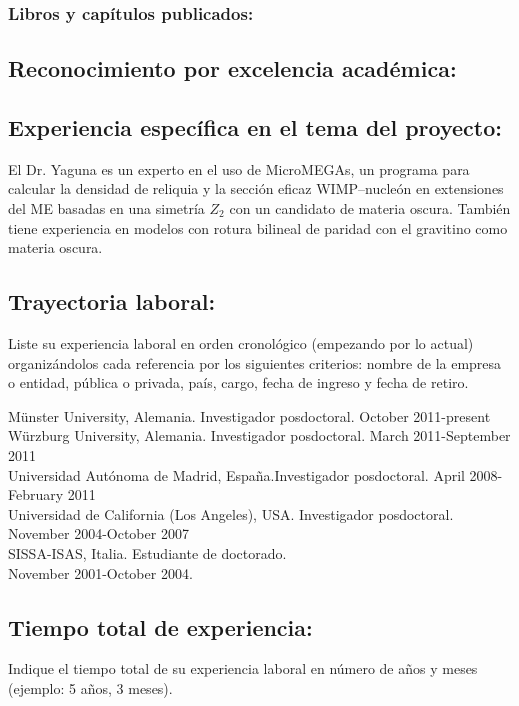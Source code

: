 \subsubsection{Libros y capítulos publicados:}
\subsection{Reconocimiento por excelencia académica:}
\subsection{Experiencia específica en el tema del proyecto:}
El Dr. Yaguna es un experto en el uso de MicroMEGAs, un programa para
calcular la densidad de reliquia y la sección eficaz WIMP--nucleón en
extensiones del ME basadas en una simetría $Z_2$ con un candidato de
materia oscura. También tiene experiencia en modelos con rotura
bilineal de paridad con el gravitino como materia oscura.
\subsection{Trayectoria laboral:}
\begin{instrucciones}
  Liste su experiencia laboral en orden cronológico (empezando por lo
  actual) organizándolos cada referencia por los siguientes criterios:
  nombre de la empresa o entidad, pública o privada, país, cargo,
  fecha de ingreso y fecha de retiro.
\end{instrucciones}
M\"unster University, Alemania. Investigador posdoctoral. October 2011-present\\
W\"urzburg University, Alemania. Investigador posdoctoral. March 2011-September 2011\\
Universidad Autónoma de Madrid, España.Investigador posdoctoral. April 2008-February 2011\\
Universidad de California (Los Angeles), USA. Investigador posdoctoral. November 2004-October 2007\\
SISSA-ISAS, Italia. Estudiante de doctorado.\\ November 2001-October 2004.\\
\subsection{Tiempo total de experiencia:}
\begin{instrucciones}
  Indique el tiempo total de su experiencia laboral en número de años
  y meses (ejemplo: 5 años, 3 meses).
\end{instrucciones}



